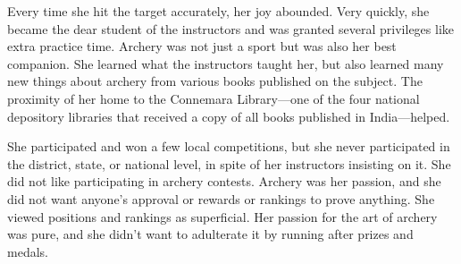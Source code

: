Every time she hit the target accurately, her joy abounded. Very quickly, she
became the dear student of the instructors and was granted several privileges
like extra practice time. Archery was not just a sport but was also her best
companion. She learned what the instructors taught her, but also learned many
new things about archery from various books published on the subject. The
proximity of her home to the Connemara Library—one of the four national
depository libraries that received a copy of all books published in India—helped.

She participated and won a few local competitions, but she never participated in the
district, state, or national level, in spite of her
instructors insisting on it. She did not like participating in archery contests.
Archery was her passion, and she did not want anyone's approval or rewards or
rankings to prove anything. She viewed positions and rankings as superficial. Her
passion for the art of archery was pure, and she didn't want to
adulterate it by running after prizes and medals.
